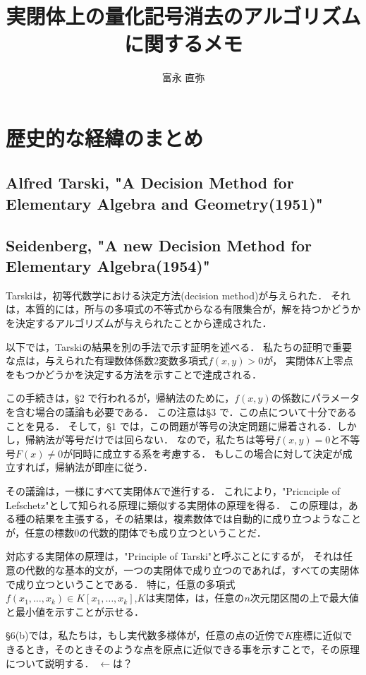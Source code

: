 \documentclass[uplatex, dvipdfmx]{jsarticle}
\theoremstyle{definition}
\begin{document}
\title{実閉体上の量化記号消去のアルゴリズムに関するメモ}
\author{富永 直弥}
\maketitle

\section{歴史的な経緯のまとめ}
\subsection{Alfred Tarski, "A Decision Method for Elementary Algebra and Geometry(1951)"}
\subsection{Seidenberg, "A new Decision Method for Elementary Algebra(1954)"}
Tarskiは，初等代数学における決定方法(decision method)が与えられた．
それは，本質的には，所与の多項式の不等式からなる有限集合が，解を持つかどうかを決定するアルゴリズムが与えられたことから達成された．

以下では，Tarskiの結果を別の手法で示す証明を述べる．
私たちの証明で重要な点は，与えられた有理数体係数2変数多項式$f(x,y) > 0$が，
実閉体$K$上零点をもつかどうかを決定する方法を示すことで達成される．

この手続きは，\S 2 で行われるが，帰納法のために，$f(x,y)$の係数にパラメータを含む場合の議論も必要である．
この注意は\S 3 で．この点について十分であることを見る．
そして，\S 1 では，この問題が等号の決定問題に帰着される．しかし，帰納法が等号だけでは回らない．
なので，私たちは等号$f(x,y)=0$と不等号$F(x) \neq 0$が同時に成立する系を考慮する．
もしこの場合に対して決定が成立すれば，帰納法が即座に従う．

その議論は，一様にすべて実閉体$K$で進行する．
これにより，"Pricnciple of Lefschetz"として知られる原理に類似する実閉体の原理を得る．
この原理は，ある種の結果を主張する，その結果は，複素数体では自動的に成り立つようなことが，任意の標数0の代数的閉体でも成り立つということだ．

対応する実閉体の原理は，"Principle of Tarski"と呼ぶことにするが，
それは任意の代数的な基本的文が，一つの実閉体で成り立つのであれば，すべての実閉体で成り立つということである．
特に，任意の多項式$f(x_1, \dots, x_k) \in K[x_1, \dots, x_k]$,$K$は実閉体，は，任意の$n$次元閉区間の上で最大値と最小値を示すことが示せる．

\S 6(b)では，私たちは，もし実代数多様体が，任意の点の近傍で$K$座標に近似できるとき，そのときそのような点を原点に近似できる事を示すことで，その原理について説明する．
$\leftarrow$は？
\end{document}
